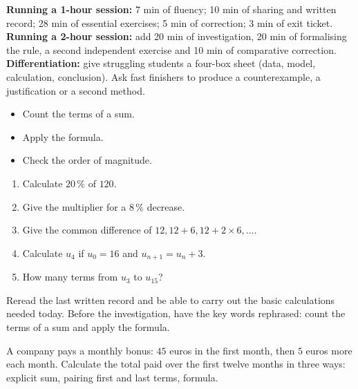 \ifprof
\begin{methode}
\textbf{Running a 1-hour session:} 7 min of fluency; 10 min of sharing and written record; 28 min of essential exercises; 5 min of correction; 3 min of exit ticket.\\
\textbf{Running a 2-hour session:} add 20 min of investigation, 20 min of formalising the rule, a second independent exercise and 10 min of comparative correction.\\
\textbf{Differentiation:} give struggling students a four-box sheet (data, model, calculation, conclusion). Ask fast finishers to produce a counterexample, a justification or a second method.
\end{methode}
\fi
{}
\begin{objectifs}\begin{itemize}\item Count the terms of a sum.\item Apply the formula.\item Check the order of magnitude.\end{itemize}\end{objectifs}
\begin{automatismes}\begin{enumerate}\item Calculate $20\,\%$ of $120$. \item Give the multiplier for a $8\,\%$ decrease. \item Give the common difference of $12,12+6,12+2\times6,\ldots$. \item Calculate $u_4$ if $u_0=16$ and $u_{n+1}=u_n+3$. \item How many terms from $u_3$ to $u_{15}$? \end{enumerate}\end{automatismes}
\begin{prerequis}Reread the last written record and be able to carry out the basic calculations needed today. Before the investigation, have the key words rephrased: count the terms of a sum and apply the formula.\end{prerequis}

\begin{activite}
A company pays a monthly bonus: $45$ euros in the first month, then $5$ euros more each month. Calculate the total paid over the first twelve months in three ways: explicit sum, pairing first and last terms, formula.

\end{activite}

